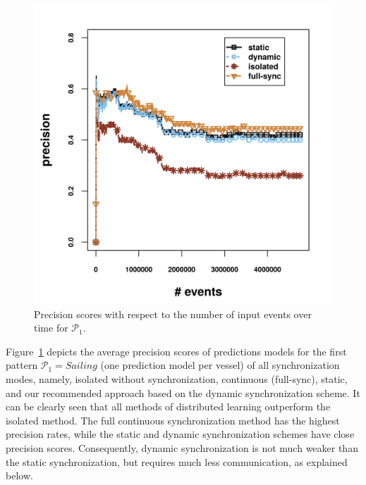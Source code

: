 \begin{figure}[H]
	\centering
	\includegraphics[width=\textwidth,keepaspectratio]{chapters/figures/synopses/new/precision_p1.png}
	
	\caption{Precision scores with respect to the number of input events over time for $\mathcal{P}_1$.}
	\label{fig:precsions}
\end{figure}

\par Figure~\ref{fig:precsions} depicts the average precision scores of predictions models for the first pattern $\mathcal{P}_1=Sailing$ (one prediction model per vessel) of all synchronization modes, namely, isolated without synchronization, continuous (full-sync), static, and our recommended approach based on the dynamic synchronization scheme. It can be clearly seen that all methods of distributed learning outperform the isolated method. The full continuous synchronization method has the highest precision rates, while the static and dynamic synchronization schemes have close precision scores. Consequently, dynamic synchronization is not much weaker than the static synchronization, but requires much less communication, as explained below.


